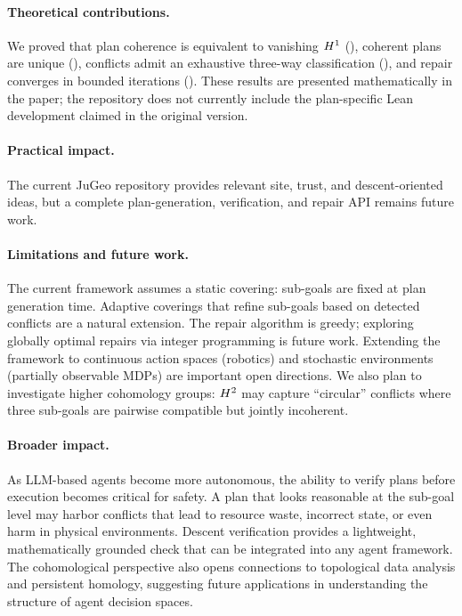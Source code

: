 \documentclass[11pt]{article}
\begin{document}
\paragraph{Theoretical contributions.}
We proved that plan coherence is equivalent to vanishing
$H^{1}$ (), coherent plans are unique
(), conflicts admit an exhaustive
three-way classification (), and
repair converges in bounded iterations ().
These results are presented mathematically in the paper; the repository
does not currently include the plan-specific Lean development claimed in
the original version.

\paragraph{Practical impact.}
The current JuGeo repository provides relevant site, trust, and
descent-oriented ideas, but a complete plan-generation, verification,
and repair API remains future work.

\paragraph{Limitations and future work.}
The current framework assumes a static covering: sub-goals are
fixed at plan generation time.  Adaptive coverings that refine
sub-goals based on detected conflicts are a natural extension.
The repair algorithm is greedy; exploring globally optimal
repairs via integer programming is future work.  Extending the
framework to continuous action spaces (robotics) and stochastic
environments (partially observable MDPs) are important open
directions.  We also plan to investigate higher cohomology groups:
$H^{2}$ may capture ``circular'' conflicts where three sub-goals
are pairwise compatible but jointly incoherent.

\paragraph{Broader impact.}
As LLM-based agents become more autonomous, the ability to verify
plans before execution becomes critical for safety.  A plan that
looks reasonable at the sub-goal level may harbor conflicts that
lead to resource waste, incorrect state, or even harm in physical
environments.  Descent verification provides a lightweight,
mathematically grounded check that can be integrated into any
agent framework.  The cohomological perspective also opens
connections to topological data analysis and persistent homology,
suggesting future applications in understanding the structure
of agent decision spaces.
\end{document}
